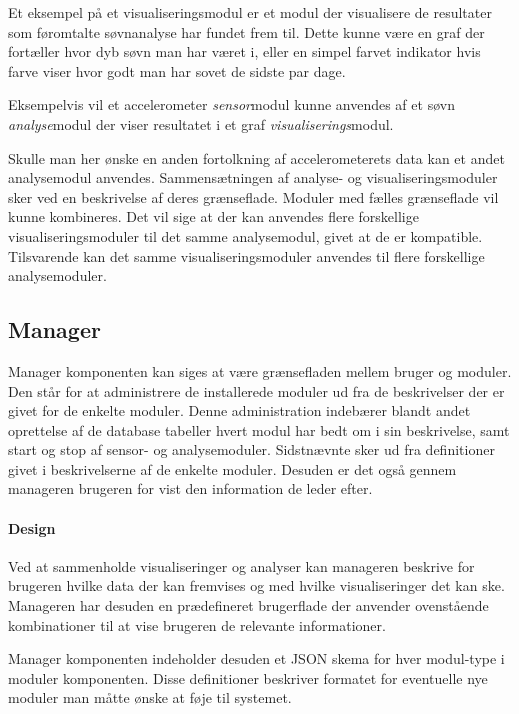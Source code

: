 Et eksempel på et visualiseringsmodul er et modul der visualisere de resultater som føromtalte søvnanalyse har fundet frem til.
Dette kunne være en graf der fortæller hvor dyb søvn man har været i, eller en simpel farvet indikator hvis farve viser hvor godt man har sovet de sidste par dage.

Eksempelvis vil et accelerometer \textit{sensor}modul kunne anvendes af et søvn \textit{analyse}modul der viser resultatet i et graf \textit{visualiserings}modul.

Skulle man her ønske en anden fortolkning af accelerometerets data kan et andet analysemodul anvendes.
Sammensætningen af analyse- og visualiseringsmoduler sker ved en beskrivelse af deres grænseflade.
Moduler med fælles grænseflade vil kunne kombineres.
Det vil sige at der kan anvendes flere forskellige visualiseringsmoduler til det samme analysemodul, givet at de er kompatible.
Tilsvarende kan det samme visualiseringsmoduler anvendes til flere forskellige analysemoduler.

\subsection{Manager}\label{subsec:arkitektur-Manager}
Manager komponenten kan siges at være grænsefladen mellem bruger og moduler.
Den står for at administrere de installerede moduler ud fra de beskrivelser der er givet for de enkelte moduler.
Denne administration indebærer blandt andet oprettelse af de database tabeller hvert modul har bedt om i sin beskrivelse, samt start og stop af sensor- og analysemoduler.
Sidstnævnte sker ud fra definitioner givet i beskrivelserne af de enkelte moduler.
Desuden er det også gennem manageren brugeren for vist den information de leder efter.

\paragraph{Design}
Ved at sammenholde visualiseringer og analyser kan manageren beskrive for brugeren hvilke data der kan fremvises og med hvilke visualiseringer det kan ske.
Manageren har desuden en prædefineret brugerflade der anvender ovenstående kombinationer til at vise brugeren de relevante informationer.

Manager komponenten indeholder desuden et JSON skema for hver modul-type i moduler komponenten.
Disse definitioner beskriver formatet for eventuelle nye moduler man måtte ønske at føje til systemet.

